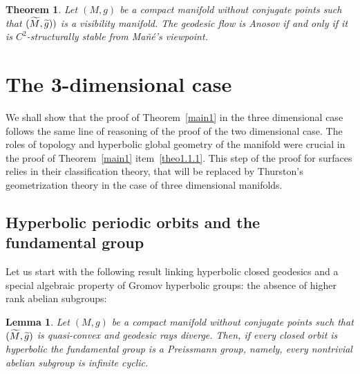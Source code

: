 \documentclass[10pt]{amsart}
\newtheorem{theo}[cdrthm]{Theorem}
\newtheorem{lemm}[cdrthm]{Lemma}
\theoremstyle{definition}
\let\oldtilde\tilde
\renewcommand*{\tilde}[1]{\mathchoice{\widetilde{#1}}{\widetilde{#1}}{\oldtilde{#1}}{\oldtilde{#1}}}
\begin{document}
\begin{theo}\label{stability-visibility}
Let $(M,g)$ be a compact manifold without conjugate points such that $(\tilde{M}, \tilde{g}))$ is a visibility manifold. The geodesic flow is Anosov if and only if it is $C^{2}$-structurally stable from Mañé's viewpoint.
\end{theo}


\section{The 3-dimensional case}\label{sect.7}

We shall show that the proof of Theorem~\ref{main1} in the three dimensional case follows the same line of reasoning of the proof of the two dimensional case. The roles of topology and hyperbolic global geometry of the manifold were crucial in the proof of Theorem~\ref{main1} item~\eqref{theo1.1.1}. This step of the proof for surfaces relies in their classification theory, that will be replaced by Thurston's geometrization theory in the case of three dimensional manifolds.

\subsection{Hyperbolic periodic orbits and the fundamental group}

Let us start with the following result linking hyperbolic closed geodesics and a special algebraic property of Gromov hyperbolic groups: the absence of higher rank abelian subgroups:

\begin{lemm}\label{Preissmann}
Let $(M,g)$ be a compact manifold without conjugate points such that $(\tilde{M}, \tilde{g})$ is quasi-convex and geodesic rays diverge. Then, if every closed orbit is hyperbolic the fundamental group is a Preissmann group, namely, every nontrivial abelian subgroup is infinite cyclic.
\end{lemm}
\end{document}
